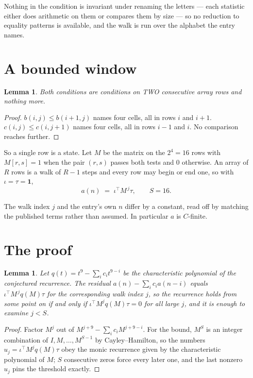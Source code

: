 \documentclass[11pt,a4paper]{article}
\theoremstyle{plain}
\newtheorem{lemma}[theorem]{Lemma}
\theoremstyle{definition}
\begin{document}
Nothing in the condition is invariant under renaming the letters --- each statistic either does
arithmetic on them or compares them by size --- so no reduction to equality patterns is
available, and the walk is run over the alphabet the entry names.

\section{A bounded window}

\begin{lemma}\label{lem:win}
Both conditions are conditions on TWO consecutive array rows and nothing more.
\end{lemma}

\begin{proof}
$b(i,j)\le b(i{+}1,j)$ names four cells, all in rows $i$ and $i+1$. $c(i,j)\le c(i,j{+}1)$
names four cells, all in rows $i-1$ and $i$. No comparison reaches further.
\end{proof}

So a single row is a state. Let $M$ be the matrix on the $2^{4}=16$ rows with
$M[r,s]=1$ when the pair $(r,s)$ passes both tests and $0$ otherwise. An array of $R$ rows is a
walk of $R-1$ steps and every row may begin or end one, so with $\iota=\tau=\mathbf{1}$,
\[
a(n)\;=\;\iota^{\!\top}M^{\,j}\tau ,\qquad S=16.
\]

The walk index $j$ and the entry's own $n$ differ by a constant, read off by matching the
published terms rather than assumed. In particular $a$ is $C$-finite.

\section{The proof}

\begin{lemma}\label{lem:crit}
Let $q(t)=t^{9}-\sum_i c_it^{9-i}$ be the characteristic polynomial of the
conjectured recurrence. The residual $a(n)-\sum_ic_ia(n-i)$ equals
$\iota^{\!\top}M^{\,j}q(M)\tau$ for the corresponding walk index $j$, so the recurrence
holds from some point on if and only if $\iota^{\!\top}M^{j}q(M)\tau=0$ for all large $j$,
and it is enough to examine $j<S$.
\end{lemma}

\begin{proof}
Factor $M^{j}$ out of $M^{j+9}-\sum_ic_iM^{j+9-i}$. For the bound, $M^{S}$
is an integer combination of $I,M,\dots,M^{S-1}$ by Cayley--Hamilton, so the numbers
$u_j=\iota^{\!\top}M^{j}q(M)\tau$ obey the monic recurrence given by the characteristic
polynomial of $M$; $S$ consecutive zeros force every later one, and the last nonzero $u_j$
pins the threshold exactly.
\end{proof}
\end{document}
